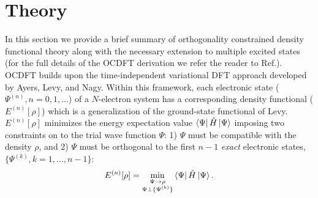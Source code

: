 \documentclass[8.5pt,twoside,twocolumn]{article}
\newcommand{\bra}[2][0]
{\ifthenelse{\equal{#1}{0}}{\left\langle #2 \right|}
{\ifthenelse{\equal{#1}{1}}{\big\langle #2 \big|}
{\ifthenelse{\equal{#1}{2}}{\Big\langle #2 \Big|}
{\ifthenelse{\equal{#1}{3}}{\bigg\langle #2 \bigg|}
{\ifthenelse{\equal{#1}{4}}{\Bigg\langle #2 \Bigg|}
{Error}}}}}
}
\newcommand{\ket}[2][0]
{\ifthenelse{\equal{#1}{0}}{\left| #2 \right\rangle}
{\ifthenelse{\equal{#1}{1}}{\big| #2 \big\rangle}
{\ifthenelse{\equal{#1}{2}}{\Big| #2 \Big\rangle}
{\ifthenelse{\equal{#1}{3}}{\bigg| #2 \bigg\rangle}
{\ifthenelse{\equal{#1}{4}}{\Bigg| #2 \Bigg\rangle}
{Error}}}}}
}
\begin{document}
\section{Theory}
In this section we provide a brief summary of orthogonality constrained density functional theory along with the necessary extension to multiple excited states (for the full details of the OCDFT derivation we refer the reader to Ref.).
OCDFT builds upon the time-independent variational DFT approach developed by Ayers, Levy, and Nagy.\cite{ayers_time-independent_2012}
Within this framework, each electronic state ($\Psi^{(n)}, n=0,1,\ldots$) of a $N$-electron system has a corresponding density functional ($E^{(n)}[\rho]$) which is a generalization of the ground-state functional of Levy.   $E^{(n)}[\rho]$ minimizes the energy expectation value $\bra{\Psi}\hat{H}\ket{\Psi}$ imposing two constraints on to the trial wave function $\Psi$: 1) $\Psi$ must be compatible with the density $\rho$, and 2) $\Psi$ must be orthogonal to the first $n-1$ \textit{exact} electronic states, $\{\Psi^{(k)}, k = 1,\ldots,n-1\}$:
\begin{equation}
E^{(n)}[\rho] = \min_{
\substack{
\Psi \rightarrow \rho\\
\Psi\bot \{\Psi^{(k)}\}
}
}
\bra{\Psi}\hat{H}\ket{\Psi}.
\end{equation}
\end{document}
